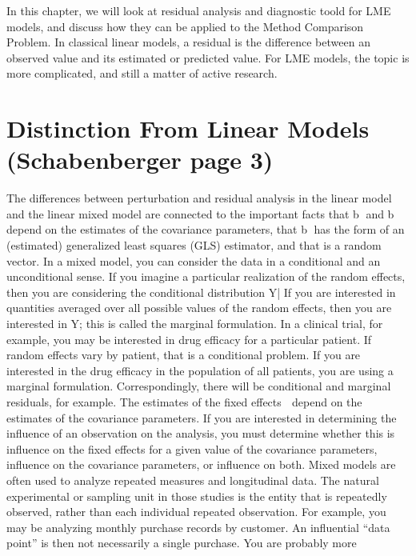 \documentclass[12pt, a4paper]{report}
\theoremstyle{plain}
\theoremstyle{definition}
\theoremstyle{remark}
\begin{document}
	

In this chapter, we will look at residual analysis and diagnostic toold for LME models, and discuss how they can be applied to the Method Comparison Problem.	In classical linear models, a residual is the difference between an observed value and its estimated or predicted value. For LME models, the topic is more complicated, and still a matter of active research. 


	\section{Distinction From Linear Models (Schabenberger page 3)}
 The differences between perturbation and residual analysis in the linear model and the linear mixed model
		are connected to the important facts that b and b
		depend on the estimates of the covariance parameters,
		that b has the form of an (estimated) generalized least squares (GLS) estimator, and that 
		is a random
		vector.
 In a mixed model, you can consider the data in a conditional and an unconditional sense. If you imagine
		a particular realization of the random effects, then you are considering the conditional distribution
		Y|
 If you are interested in quantities averaged over all possible values of the random effects, then
		you are interested in Y; this is called the marginal formulation. In a clinical trial, for example, you
		may be interested in drug efficacy for a particular patient. If random effects vary by patient, that is a
		conditional problem. If you are interested in the drug efficacy in the population of all patients, you are
		using a marginal formulation. Correspondingly, there will be conditional and marginal residuals, for
		example.
The estimates of the fixed effects  depend on the estimates of the covariance parameters. If you are
		interested in determining the influence of an observation on the analysis, you must determine whether
		this is influence on the fixed effects for a given value of the covariance parameters, influence on the
		covariance parameters, or influence on both.
Mixed models are often used to analyze repeated measures and longitudinal data. The natural experimental
		or sampling unit in those studies is the entity that is repeatedly observed, rather than each
		individual repeated observation. For example, you may be analyzing monthly purchase records by
		customer. 
An influential “data point” is then not necessarily a single purchase. You are probably more
\end{document}

